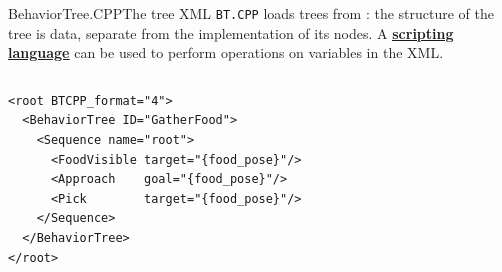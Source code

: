 \begin{frame}[fragile]{BehaviorTree.CPP}{The tree XML}
  \justifying
  \texttt{BT.CPP} loads trees from : the structure of the tree is data, separate from the implementation of its nodes. A \href{https://www.behaviortree.dev/docs/tutorial-basics/tutorial_09_scripting/}{\color{blue}\underline{\textbf{scripting language}}} can be used to perform operations on variables in the XML.
  \begin{columns}
    \begin{lstlisting}[language=btcppxml, caption=Example XML file for the food-gathering tree; the first three leaf nodes have ports; they are all wired together pointing the same blackboard entry \texttt{food\_pose} (curly braces).]
<root BTCPP_format="4">
  <BehaviorTree ID="GatherFood">
    <Sequence name="root">
      <FoodVisible target="{food_pose}"/>
      <Approach    goal="{food_pose}"/>
      <Pick        target="{food_pose}"/>
    </Sequence>
  </BehaviorTree>
</root>
\end{lstlisting}
  \end{columns}
\end{frame}
